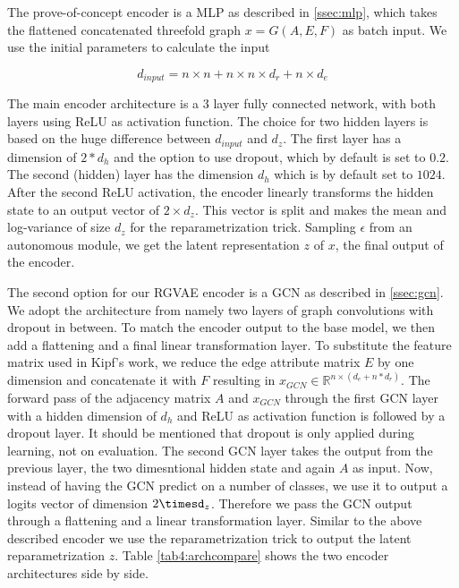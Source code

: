 The prove-of-concept encoder is a MLP as described in \ref{ssec:mlp}, which takes the flattened concatenated threefold graph $x=G(A,E,F)$ as batch input. We use the initial parameters to calculate the input

\begin{equation}
    d_{input} = n\times n + n\times n\times d_r + n\times d_e
    \label{eq4:inputdim}
\end{equation}

The main encoder architecture is a 3 layer fully connected network, with both layers using ReLU as activation function. The choice for two hidden layers is based on the huge difference between $d_{input}$ and $d_z$. The first layer has a dimension of $2*d_h$ and the option to use dropout, which by default is set to $0.2$. The second (hidden) layer has the dimension $d_h$ which is by default set to $1024$. After the second ReLU activation, the encoder linearly transforms the hidden state to an output vector of $2 \times d_z$. This vector is split and makes the mean and log-variance of size $d_z$ for the reparametrization trick. Sampling $\epsilon$ from an autonomous module, we get the latent representation $z$ of $x$,  the final output of the encoder.

The second option for our RGVAE encoder is a GCN as described in \ref{ssec:gcn}. We adopt the architecture from \cite{kipf_semi-supervised_2017} namely two layers of graph convolutions with dropout in between. To match the encoder output to the base model, we then add a flattening and a final linear transformation layer. To substitute the feature matrix used in Kipf's work, we reduce the edge attribute matrix $E$ by one dimension and concatenate it with $F$ resulting in $x_{GCN} \in \mathbb{R}^{n \times (d_e+n*d_r)}$. The forward pass of the adjacency matrix $A$ and $x_{GCN}$ through the first GCN layer with a hidden dimension of $d_h$ and ReLU as activation function is followed by a dropout layer. It should be mentioned that dropout is only applied during learning, not on evaluation. The second GCN layer takes the output from the previous layer, the two dimesntional hidden state and again $A$ as input. Now, instead of having the GCN predict on a number of classes, we use it to output a logits vector of dimension $2\timesd_z$. Therefore we pass the GCN output through a flattening and a linear transformation layer. Similar to the above described encoder we use the reparametrization trick to output the latent reparametrization $z$. Table \ref{tab4:archcompare} shows the two encoder architectures side by side.


